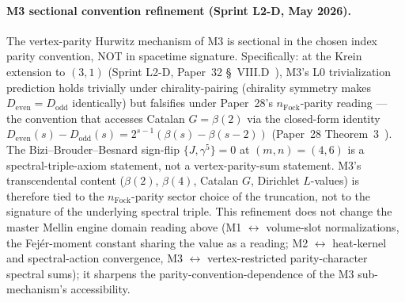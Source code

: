 \documentclass[aps,pra,twocolumn,superscriptaddress,longbibliography]{revtex4-2}
\begin{document}
\paragraph{M3 sectional convention refinement (Sprint L2-D, May 2026).}
The vertex-parity Hurwitz mechanism of M3 is sectional in the chosen
index parity convention, NOT in spacetime signature.  Specifically:
at the Krein extension to $(3, 1)$ (Sprint L2-D, Paper~32
\S~VIII.D~\cite{loutey_paper32}), M3's L0
trivialization prediction holds trivially under chirality-pairing
(chirality symmetry makes $D_{\mathrm{even}} = D_{\mathrm{odd}}$
identically) but falsifies under Paper~28's
$n_{\mathrm{Fock}}$-parity reading --- the convention that accesses
Catalan $G = \beta(2)$ via the closed-form identity
$D_{\mathrm{even}}(s) - D_{\mathrm{odd}}(s) = 2^{s-1}(\beta(s) -
\beta(s-2))$ (Paper~28 Theorem~3~\cite{loutey_paper28}).  The
Bizi--Brouder--Besnard sign-flip $\{J, \gamma^5\} = 0$ at
$(m, n) = (4, 6)$ is a spectral-triple-axiom statement, not a
vertex-parity-sum statement.  M3's transcendental content
($\beta(2)$, $\beta(4)$, Catalan $G$, Dirichlet $L$-values) is
therefore tied to the $n_{\mathrm{Fock}}$-parity sector choice of
the truncation, not to the signature of the underlying spectral
triple.  This refinement does not change the master Mellin engine
domain reading above (M1 $\leftrightarrow$ volume-slot normalizations,
the Fej\'er-moment constant sharing the value as a reading;
M2 $\leftrightarrow$ heat-kernel and spectral-action convergence,
M3 $\leftrightarrow$ vertex-restricted parity-character spectral
sums); it sharpens the parity-convention-dependence of the M3
sub-mechanism's accessibility.
\end{document}
